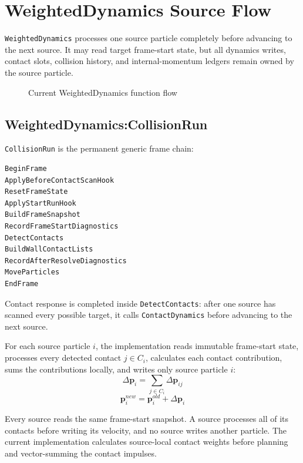 \newpage
\section{WeightedDynamics Source Flow}

\newcommand{\WeightedFunctionSection}[1]{%
  \subsection{WeightedDynamics:#1}%
  \label{weighted:#1}%
}

\texttt{WeightedDynamics} processes one source particle completely before
advancing to the next source.  It may read target frame-start state, but all
dynamics writes, contact slots, collision history, and internal-momentum
ledgers remain owned by the source particle.

\begin{figure}[ht]
\centering
\resizebox{\textwidth}{!}{}
\caption{Current WeightedDynamics function flow}
\end{figure}

\clearpage

\WeightedFunctionSection{CollisionRun}

\texttt{CollisionRun} is the permanent generic frame chain:

\begin{verbatim}
BeginFrame
ApplyBeforeContactScanHook
ResetFrameState
ApplyStartRunHook
BuildFrameSnapshot
RecordFrameStartDiagnostics
DetectContacts
BuildWallContactLists
RecordAfterResolveDiagnostics
MoveParticles
EndFrame
\end{verbatim}

Contact response is completed inside \texttt{DetectContacts}: after one source
has scanned every possible target, it calls \texttt{ContactDynamics} before
advancing to the next source.

For each source particle \(i\), the implementation reads immutable frame-start
state, processes every detected contact \(j \in C_i\), calculates each contact
contribution, sums the contributions locally, and writes only source particle
\(i\):
\[
\Delta\mathbf p_i
=
\sum_{j\in C_i}\Delta\mathbf p_{ij}
\]
\[
\mathbf p_i^{new}
=
\mathbf p_i^{old}+\Delta\mathbf p_i
\]

Every source reads the same frame-start snapshot.  A source processes all of its
contacts before writing its velocity, and no source writes another particle.
The current implementation calculates source-local contact weights before
planning and vector-summing the contact impulses.

